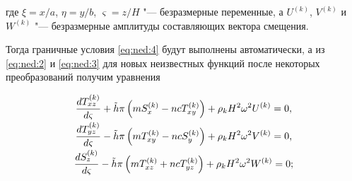 где  $\xi={x/a}$, $\eta={y/b}$, $\varsigma={z/{H}}$ "--- безразмерные переменные, а $U^{(k)}$, $V^{(k)}$ и~$W^{(k)}$ "--- безразмерные амплитуды составляющих вектора смещения.



Тогда граничные условия \eqref{eq:ned:4} будут выполнены автоматически, а из \eqref{eq:ned:2} и \eqref{eq:ned:3} для новых неизвестных функций после некоторых преобразований получим уравнения

\begin{equation}

\label{eq:ned:8}

\begin{array}{c}

\displaystyle\frac{{dT_{xz}^{(k)}}}{{d\varsigma}}+\tilde h\pi\left({mS_x^{(k)} -ncT_{xy}^{(k)}}\right)+\rho_k H^2\omega ^2 U^{(k)}=0, \vspace{1mm}\\ 



\displaystyle\frac{{dT_{yz}^{(k)}}}{{d\varsigma}}-\tilde h\pi\left({mT_{xy}^{(k)} -ncS_y^{(k)}}\right)+\rho_k H^2\omega ^2 V^{(k)}=0, \vspace{1mm}\\ 



\displaystyle\frac{{dS_z^{(k)}}}{{d\varsigma}}-\tilde h\pi\left({mT_{xz}^{(k)}+ncT_{yz}^{(k)}}\right)+\rho_k H^2\omega ^2 W^{(k)}=0;

\end{array}

\end{equation}

